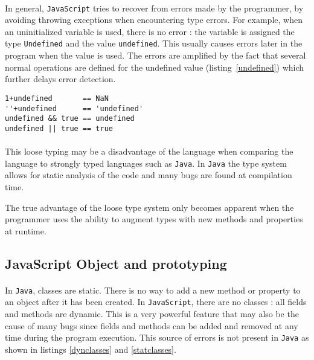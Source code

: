 \paragraph{}
In general, \texttt{JavaScript} tries to recover from errors made by the programmer, by avoiding throwing exceptions when encountering type errors. For example, when an uninitialized variable is used, there is no error : the variable is assigned the type \texttt{Undefined} and the value \texttt{undefined}. This usually causes errors later in the program when the value is used. The errors are amplified by the fact that several normal operations are defined for the undefined value (listing~\ref{undefined}) which further delays error detection.
\begin{lstlisting}[caption=Normal operations on undefined value,label=undefined]
1+undefined       == NaN
''+undefined      == 'undefined'
undefined && true == undefined
undefined || true == true
\end{lstlisting}	
\paragraph{}
This loose typing may be a disadvantage of the language when comparing the language to strongly typed languages such as \texttt{Java}. In \texttt{Java} the type system allows for static analysis of the code and many bugs are found at compilation time. 

The true advantage of the loose type system only becomes apparent when the programmer uses the ability to augment types with new methods and properties at runtime.

\subsection{JavaScript Object and prototyping}
\paragraph{}
In \texttt{Java}, classes are static. There is no way to add a new method or property to an object after it has been created. In \texttt{JavaScript}, there are no classes : all fields and methods are dynamic. This is a very powerful feature that may also be the cause of many bugs since fields and methods can be added and removed at any time during the program execution. This source of errors is not present in \texttt{Java} as shown in listings \ref{dynclasses} and \ref{statclasses}.

